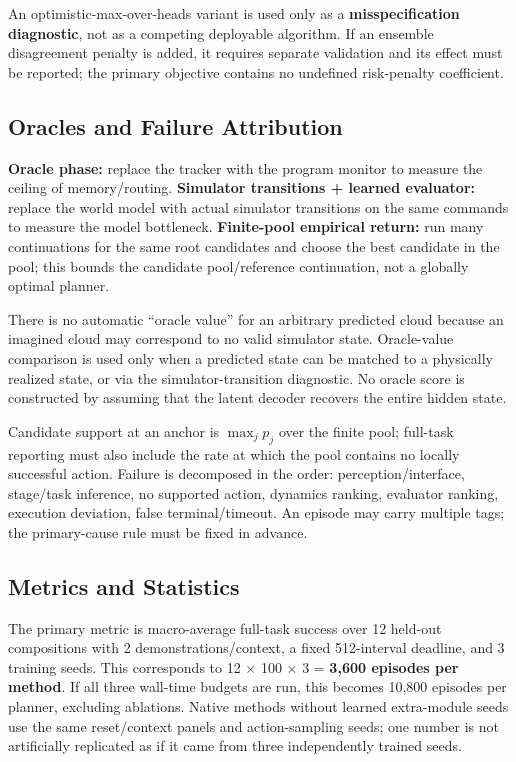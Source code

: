 \documentclass[
  10pt,
]{article}
\begin{document}
An optimistic-max-over-heads variant is used only as a \textbf{misspecification diagnostic}, not as a competing deployable algorithm. If an ensemble disagreement penalty is added, it requires separate validation and its effect must be reported; the primary objective contains no undefined risk-penalty coefficient.

\hypertarget{oracles-vuxe0-phuxe2n-ruxe3-nguyuxean-nhuxe2n-lux1ed7i}{%
\subsection{Oracles and Failure Attribution}\label{oracles-vuxe0-phuxe2n-ruxe3-nguyuxean-nhuxe2n-lux1ed7i}}

\textbf{Oracle phase:} replace the tracker with the program monitor to measure the ceiling of memory/routing. \textbf{Simulator transitions + learned evaluator:} replace the world model with actual simulator transitions on the same commands to measure the model bottleneck. \textbf{Finite-pool empirical return:} run many continuations for the same root candidates and choose the best candidate in the pool; this bounds the candidate pool/reference continuation, not a globally optimal planner.

There is no automatic ``oracle value'' for an arbitrary predicted cloud because an imagined cloud may correspond to no valid simulator state. Oracle-value comparison is used only when a predicted state can be matched to a physically realized state, or via the simulator-transition diagnostic. No oracle score is constructed by assuming that the latent decoder recovers the entire hidden state.

Candidate support at an anchor is \(\max_j p_j\) over the finite pool; full-task reporting must also include the rate at which the pool contains no locally successful action. Failure is decomposed in the order: perception/interface, stage/task inference, no supported action, dynamics ranking, evaluator ranking, execution deviation, false terminal/timeout. An episode may carry multiple tags; the primary-cause rule must be fixed in advance.

\hypertarget{metrics-vuxe0-thux1ed1ng-kuxea}{%
\subsection{Metrics and Statistics}\label{metrics-vuxe0-thux1ed1ng-kuxea}}

The primary metric is macro-average full-task success over 12 held-out compositions with 2 demonstrations/context, a fixed 512-interval deadline, and 3 training seeds. This corresponds to 12 \(\times\) 100 \(\times\) 3 = \textbf{3,600 episodes per method}. If all three wall-time budgets are run, this becomes 10,800 episodes per planner, excluding ablations. Native methods without learned extra-module seeds use the same reset/context panels and action-sampling seeds; one number is not artificially replicated as if it came from three independently trained seeds.
\end{document}

